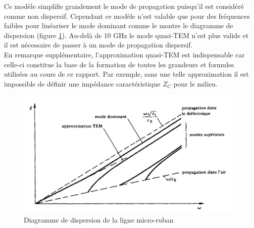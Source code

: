 \documentclass[french]{article}
\begin{document}
Ce modèle simplifie grandement le mode de propagation puisqu'il est considéré comme non dispersif. Cependant ce modèle n'est valable que pour des fréquences faibles pour linéariser le mode dominant comme le montre le diagramme de dispersion (figure \ref{fig:diagramme_dispersion}). Au-delà de 10 GHz le mode quasi-TEM n'est plus valide et il est nécessaire de passer à un mode de propagation dispersif.\\
En remarque supplémentaire, l'approximation quasi-TEM est indispensable car celle-ci constitue la base de la formation de toutes les grandeurs et formules utilisées au cours de ce rapport. Par exemple, sans une telle approximation il est impossible de définir une impédance caractéristique $Z_C$ pour le milieu.

\begin{figure}[H]
	\centering
	\includegraphics[scale=0.3]{../2carac/caract_large_bande/approx_QTEM.png}
	\caption{Diagramme de dispersion de la ligne micro-ruban}
	\label{fig:diagramme_dispersion}
\end{figure}

\newpage
\end{document}
